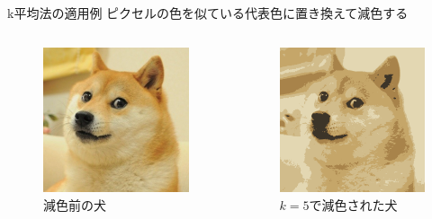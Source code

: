 \documentclass[dvipdfmx,platex]{beamer}
\begin{document}
\begin{frame}{{\mgfamily k平均法の適用例}}
  ピクセルの色を似ている代表色に置き換えて減色する
    \begin{columns}[T,onlytextwidth]
    \begin{figure}
      \centering
      \includegraphics[width=5cm]{fig/doge.png}
      \caption{{\mgfamily 減色前の犬}}
    \end{figure}
    \begin{figure}
      \centering
      \includegraphics[width=5cm]{fig/doge_q.png}
      \caption{$k=5${\mgfamily で減色された犬}}
    \end{figure}
  \end{columns}
\end{frame}
\end{document}
